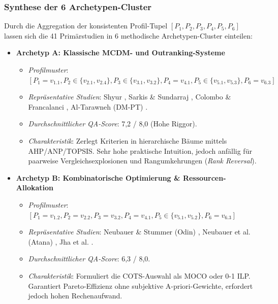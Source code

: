 \subsubsection{Synthese der 6 Archetypen-Cluster}

Durch die Aggregation der konsistenten Profil-Tupel $[P_1, P_2, P_3, P_4, P_5, P_6]$ lassen sich die 41 Primärstudien in 6 methodische Archetypen-Cluster einteilen:

\begin{itemize}
    \item \textbf{Archetyp A: Klassische MCDM- und Outranking-Systeme}
    \begin{itemize}
        \item \textit{Profilmuster}: $[P_1=v_{1.1}, P_2 \in \{v_{2.1}, v_{2.4}\}, P_3 \in \{v_{3.1}, v_{3.2}\}, P_4=v_{4.1}, P_5 \in \{v_{5.1}, v_{5.3}\}, P_6=v_{6.3}]$
        \item \textit{Repräsentative Studien}: Shyur \cite{U5JPV4SF}, Sarkis \& Sundarraj \cite{FCYW9EWJ}, Colombo \& Francalanci \cite{DAU8NSK8}, Al-Tarawneh (DM-PT) \cite{WZM7DUBY}.
        \item \textit{Durchschnittlicher QA-Score}: 7,2 / 8,0 (Hohe Riggor).
        \item \textit{Charakteristik}: Zerlegt Kriterien in hierarchische Bäume mittels AHP/ANP/TOPSIS. Sehr hohe praktische Intuition, jedoch anfällig für paarweise Vergleichsexplosionen und Rangumkehrungen (\textit{Rank Reversal}).
    \end{itemize}

    \item \textbf{Archetyp B: Kombinatorische Optimierung \& Ressourcen-Allokation}
    \begin{itemize}
        \item \textit{Profilmuster}: $[P_1=v_{1.2}, P_2=v_{2.2}, P_3=v_{3.2}, P_4=v_{4.1}, P_5 \in \{v_{5.1}, v_{5.2}\}, P_6=v_{6.3}]$
        \item \textit{Repräsentative Studien}: Neubauer \& Stummer (Odin) \cite{ZQMG69VT}, Neubauer et al. (Atana) \cite{MZ8JHDYA}, Jha et al. \cite{VUVLUN85}.
        \item \textit{Durchschnittlicher QA-Score}: 6,3 / 8,0.
        \item \textit{Charakteristik}: Formuliert die COTS-Auswahl als MOCO oder 0-1 ILP. Garantiert Pareto-Effizienz ohne subjektive A-priori-Gewichte, erfordert jedoch hohen Rechenaufwand.
    \end{itemize}


\end{itemize}
